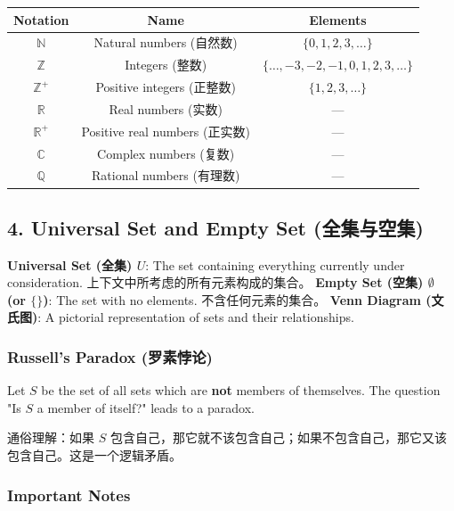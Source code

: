 \documentclass[10pt,a4paper,openany]{ctexbook}
\theoremstyle{definition}
\theoremstyle{remark}
\renewenvironment{quote}
  {\list{}{\leftmargin=1em\rightmargin=0pt\topsep=0.5pt\partopsep=0pt}\item[]}
  {\endlist}
\begin{document}
\begin{center}
\begin{tabular}{ccc}
\hline
Notation & Name & Elements \\ \hline
$\mathbb{N}$ & Natural numbers (自然数) & $\{0,1,2,3,\dots\}$ \\
$\mathbb{Z}$ & Integers (整数) & $\{\dots,-3,-2,-1,0,1,2,3,\dots\}$ \\
$\mathbb{Z}^+$ & Positive integers (正整数) & $\{1,2,3,\dots\}$ \\
$\mathbb{R}$ & Real numbers (实数) & — \\
$\mathbb{R}^+$ & Positive real numbers (正实数) & — \\
$\mathbb{C}$ & Complex numbers (复数) & — \\
$\mathbb{Q}$ & Rational numbers (有理数) & — \\
\hline
\end{tabular}

\end{center}

\vspace{-2pt}

\subsection{4. Universal Set and Empty Set (全集与空集)}

\textbf{Universal Set (全集) $U$}: The set containing everything currently under consideration. 上下文中所考虑的所有元素构成的集合。
\textbf{Empty Set (空集) $\emptyset$ (or $\{\}$)}: The set with no elements. 不含任何元素的集合。
\textbf{Venn Diagram (文氏图)}: A pictorial representation of sets and their relationships.
\subsubsection{Russell's Paradox (罗素悖论)}

Let $S$ be the set of all sets which are \textbf{not} members of themselves. The question "Is $S$ a member of itself?" leads to a paradox.
\begin{quote}
通俗理解：如果 $S$ 包含自己，那它就不该包含自己；如果不包含自己，那它又该包含自己。这是一个逻辑矛盾。

\end{quote}

\subsubsection{Important Notes}
\end{document}
